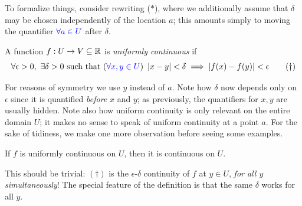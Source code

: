 
To formalize things, consider rewriting ($\ast$), where we additionally assume that $\delta$ may be chosen independently of the location $a$; this amounts simply to moving the quantifier $\textcolor{blue}{\forall a\in U}$ after $\delta$.

\begin{defn}{}{}
	A function $f:U\to V\subseteq \mathbb{R}$ is \emph{uniformly continuous} if
	\[
		\forall\epsilon>0,\ \exists\delta>0\text{ such that }(\textcolor{blue}{\forall x,y\in U})\ \nm{x-y}<\delta\implies\nm{f(x)-f(y)}<\epsilon \tag{$\dag$}
	\]
\end{defn}

For reasons of symmetry we use $y$ instead of $a$. Note how $\delta$ now depends only on $\epsilon$ since it is quantified \emph{before} $x$ and $y$; as previously, the quantifiers for $x,y$ are usually hidden. Note also how uniform continuity is only relevant on the entire domain $U$; it makes no sense to speak of uniform continuity at a point $a$.
\smallbreak
For the sake of tidiness, we make one more observation before seeing some examples.

\begin{lemm}{}{}
	If $f$ is uniformly continuous on $U$, then it is continuous on $U$.
\end{lemm}

This should be trivial: $(\dag)$ is the $\epsilon$-$\delta$ continuity of $f$ at $y\in U$, \emph{for all $y$ simultaneously}! The special feature of the definition is that the same $\delta$ works for all $y$.

\goodbreak


